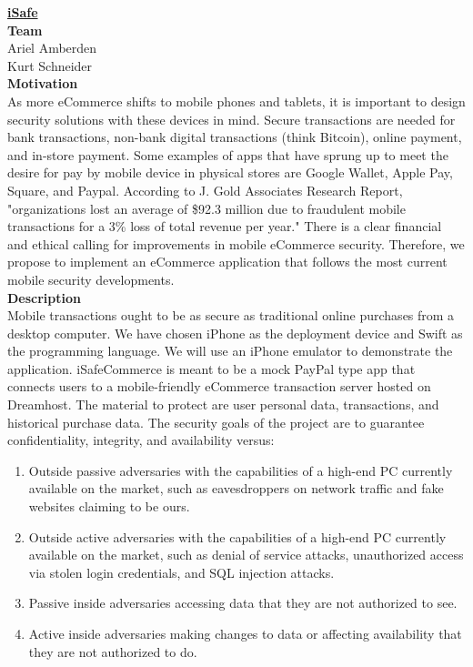 \documentclass[12pt]{article}
\begin{document}
\underline{\textbf{\large{iSafe}}} \\

\textbf{Team} \\
Ariel Amberden \\
Kurt Schneider \\

\textbf{Motivation} \\
As more eCommerce shifts to mobile phones and tablets, it is important to design security solutions with these devices in mind.  Secure transactions are needed for bank transactions, non-bank digital transactions (think Bitcoin), online payment, and in-store payment.  Some examples of apps that have sprung up to meet the desire for pay by mobile device in physical stores are Google Wallet, Apple Pay, Square, and Paypal.  According to J. Gold Associates Research Report, "organizations lost an average of \$92.3 million due to fraudulent mobile transactions for a 3\% loss of total revenue per year." There is a clear financial and ethical calling for improvements in mobile eCommerce security.  Therefore, we propose to implement an eCommerce application that follows the most current mobile security developments. \\

\textbf{Description} \\
Mobile transactions ought to be as secure as traditional online purchases from a desktop computer.  We have chosen iPhone as the deployment device and Swift as the programming language.  We will use an iPhone emulator to demonstrate the application.  iSafeCommerce is meant to be a mock PayPal type app that connects users to a mobile-friendly eCommerce transaction server hosted on Dreamhost.  The material to protect are user personal data, transactions, and historical purchase data.  The security goals of the project are to guarantee confidentiality, integrity, and availability versus:
\begin{enumerate}
\item Outside passive adversaries with the capabilities of a high-end PC currently available on the market, such as eavesdroppers on network traffic and fake websites claiming to be ours.
\item Outside active adversaries with the capabilities of a high-end PC currently available on the market, such as denial of service attacks, unauthorized access via stolen login credentials, and SQL injection attacks.
\item Passive inside adversaries accessing data that they are not authorized to see.
\item Active inside adversaries making changes to data or affecting availability that they are not authorized to do.
\end{enumerate}
\end{document}

